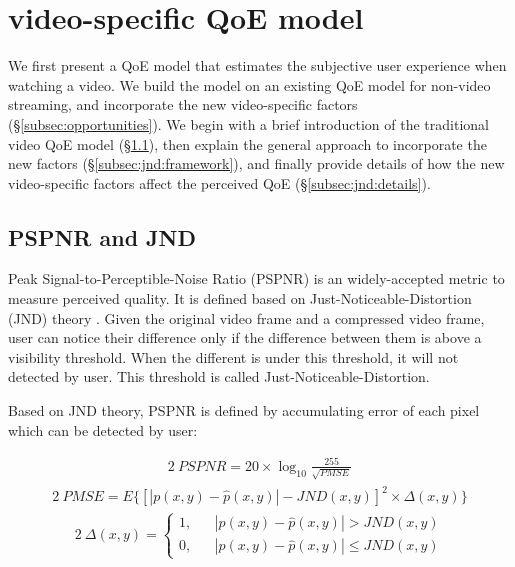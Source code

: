 
\section{\vr video-specific QoE model}
\label{sec:jnd}

We first present a QoE model that estimates the subjective user experience when watching a \vr video.
We build the model on an existing QoE model for non-\vr video streaming, and incorporate the new \vr video-specific factors (\S\ref{subsec:opportunities}).
We begin with a brief introduction of the traditional video QoE model (\S\ref{subsec:jnd:pspnr}), then explain the general approach to incorporate the new factors (\S\ref{subsec:jnd:framework}), and finally provide details of how the new \vr video-specific factors affect the perceived QoE (\S\ref{subsec:jnd:details}).

\subsection{PSPNR and JND}
\label{subsec:jnd:pspnr}


Peak Signal-to-Perceptible-Noise Ratio (PSPNR) \cite{PSPNR} is an widely-accepted metric to measure perceived quality. It is defined based on Just-Noticeable-Distortion (JND) theory \cite{JND}. Given the original video frame and a compressed video frame, user can notice their difference only if the difference between them is above a visibility threshold. When the different is under this threshold, it will not detected by user. This threshold is called Just-Noticeable-Distortion.

Based on JND theory, PSPNR is defined by accumulating error of each pixel which can be detected by user:

\begin{alignat}{2}\
\label{f1} PSPNR = 20 \times \log_{10}\frac{255}{\sqrt{PMSE}}
\end{alignat}
\begin{alignat}{2}\
PMSE=E\{ \left[ |p(x, y) - \hat{p}(x, y)| - JND(x, y)\right]^2 \times \Delta (x, y)\}
\end{alignat}
\begin{alignat}{2}\
\Delta (x, y) =\left\{
\begin{aligned}
1, & &|p(x, y) - \hat{p}(x, y)| > JND(x, y) \\
0, & &|p(x, y) - \hat{p}(x, y)| \le JND(x, y)
\end{aligned}
\right.
\end{alignat}


